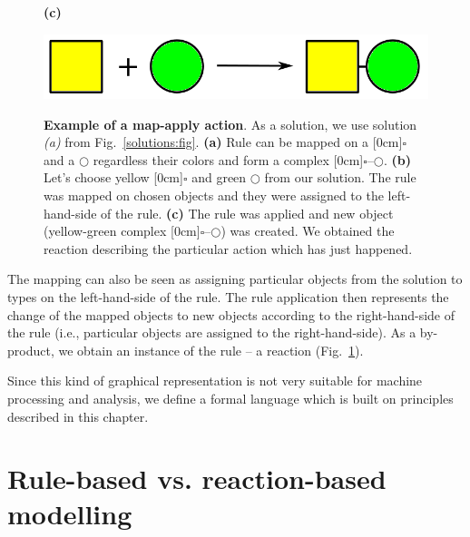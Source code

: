 \documentclass[12pt]{fithesis2}
\begin{document}
\begin{figure}[!h]
\begin{center}
\begin{minipage}[l]{0.1\textwidth}
    \textbf{(c)}
  \end{minipage}
  \begin{minipage}[r]{0.6\textwidth}
    {\hspace*{1.3cm}\includegraphics[scale=0.2]{pics/rule_reaction}}
\end{minipage}
\caption{\textbf{Example of a map-apply action}. As a solution, we use solution \textit{(a)} from Fig.~\ref{solutions:fig}. \textbf{(a)} Rule can be mapped on a \raisebox{-0.02cm}[0cm]{{\large $\square$}} and a $\bigcirc$ regardless their colors and form a complex \raisebox{-0.02cm}[0cm]{{\large $\square$}}--$\bigcirc$.  \textbf{(b)} Let's choose yellow \raisebox{-0.02cm}[0cm]{{\large $\square$}} and green $\bigcirc$ from our solution. The rule was mapped on chosen objects and they were assigned to the left-hand-side of the rule. \textbf{(c)} The rule was applied and new object (yellow-green complex \raisebox{-0.02cm}[0cm]{{\large $\square$}}--$\bigcirc$) was created. We obtained the reaction describing the particular action which has just happened.}
\label{map-apply:fig}
\end{center}
\end{figure}

The mapping can also be seen as assigning particular objects from the solution to types on the left-hand-side of the rule. The rule application then represents the change of the mapped objects to new objects according to the right-hand-side of the rule (i.e., particular objects are assigned to the right-hand-side). As a by-product, we obtain an instance of the rule -- a reaction (Fig.~\ref{map-apply:fig}). %

Since this kind of graphical representation is not very suitable for machine processing and analysis, we define a formal language which is built on principles described in this chapter.

\section{Rule-based vs. reaction-based modelling}
\end{document}
